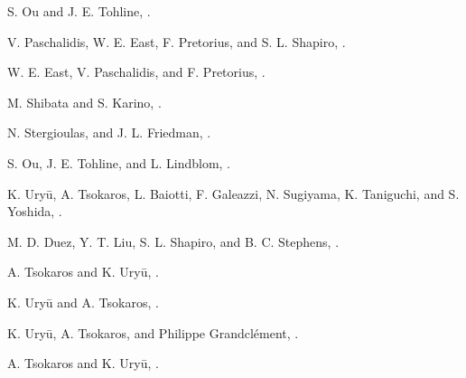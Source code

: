 S. Ou and J. E. Tohline, .

V. Paschalidis, W. E. East, F. Pretorius, and S. L. Shapiro, .

W. E. East, V. Paschalidis, and F. Pretorius, .

M. Shibata and S. Karino, .

N. Stergioulas, and J. L. Friedman, .  

S. Ou, J. E. Tohline, and L. Lindblom, .

K. Ury\=u, A. Tsokaros, L. Baiotti, F. Galeazzi, N. Sugiyama, K. Taniguchi, and S. Yoshida, .

M. D. Duez, Y. T. Liu, S. L. Shapiro, and B. C. Stephens, .

A. Tsokaros and K. Ury\=u, .

K. Ury\=u and A. Tsokaros, .   

K. Ury\=u, A. Tsokaros, and Philippe Grandcl\'ement, .   

A. Tsokaros and K. Ury\=u, .  

